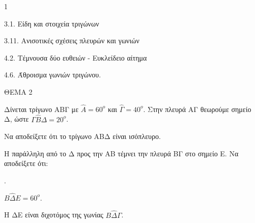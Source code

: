 \begin{ylh}{1}
    \item 3.1. Είδη και στοιχεία τριγώνων
    \item 3.11. Ανισοτικές σχέσεις πλευρών και γωνιών
    \item 4.2. Τέμνουσα δύο ευθειών - Ευκλείδειο αίτημα
    \item 4.6. Άθροισμα γωνιών τριγώνου.
\end{ylh}

ΘΕΜΑ 2

Δίνεται τρίγωνο ΑΒΓ με $\widehat{Α} = 60^{ο}$ και $\widehat{\Gamma} = 40^{ο}$. Στην πλευρά ΑΓ θεωρούμε σημείο Δ, ώστε $\Gamma\widehat{Β}\Delta = 20^{ο}$.

\begin{alist}
\item Να αποδείξετε ότι το τρίγωνο ΑΒΔ είναι ισόπλευρο. 

\item Η παράλληλη από το Δ προς την ΑΒ τέμνει την πλευρά ΒΓ στο σημείο Ε. Να αποδείξετε ότι:

.
\end{alist}
\begin{alist}
\item
  $Β\widehat{\Delta}Ε = 60^{ο}$. 
\item
  Η ΔΕ είναι διχοτόμος της γωνίας $Β\widehat{\Delta}\Gamma$. 


\begin{center}
\end{center}
\end{alist}
